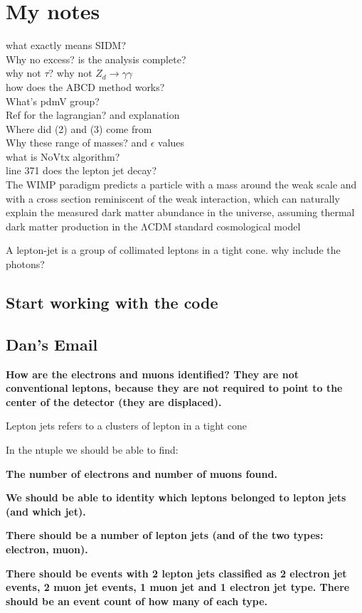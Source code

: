 \chapter{My notes}\label{ch:ananotes}
what exactly means SIDM?\\
Why no excess? is the analysis complete?\\
why not $\tau$? why not $Z_d \rightarrow \gamma\gamma$\\
how does the ABCD method works?\\
What's pdmV group?\\
Ref for the lagrangian? and explanation\\
Where did (2) and (3) come from\\
Why these range of masses? and $\epsilon$ values\\
what is NoVtx algorithm?\\
line 371 does the lepton jet decay?\\

The WIMP paradigm predicts a particle with a mass around the weak scale and with a cross section reminiscent of the weak interaction, which can naturally explain the measured dark matter abundance in the universe, assuming thermal dark matter production in the ΛCDM standard cosmological model

A lepton-jet is a group of collimated leptons in a tight cone. why include the photons?\\

\section{Start working with the code}
\section{Dan's Email}
\textbf{How are the electrons and muons identified? They are not conventional leptons, because they are not required to point to the center of the detector (they are displaced).}

{}
Lepton jets refers to a clusters of lepton in a tight cone

In the ntuple we should be able to find:

\textbf{The number of electrons and number of muons found.}

\textbf{We should be able to identity which leptons belonged to lepton jets (and which jet).}

\textbf{There should be a number of lepton jets (and of the two types: electron, muon).}

\textbf{There should be events with 2 lepton jets classified as 2 electron jet events, 2 muon jet events, 1 muon jet and 1 electron jet type.  There should be an event count of how many of each type.}


